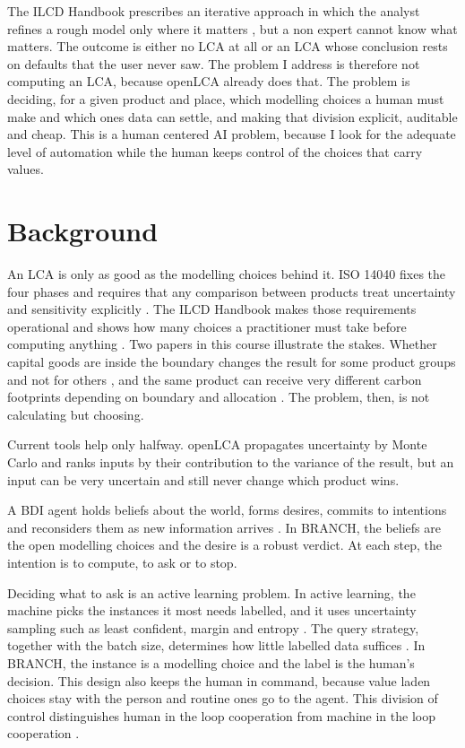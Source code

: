 \documentclass{article}
\begin{document}
The ILCD Handbook prescribes an iterative approach in which the analyst refines a rough model only where
it matters \citep[25]{ilcd2010}, but a non expert cannot know what matters. The outcome is either no LCA
at all or an LCA whose conclusion rests on defaults that the user never saw. The problem I address is therefore not computing an LCA, because openLCA already does that. The problem is
deciding, for a given product and place, which modelling choices a human must make and which ones data can
settle, and making that division explicit, auditable and cheap. This is a human centered AI problem,
because I look for the adequate level of automation while the human keeps control of the choices that
carry values.

\section{Background}
An LCA is only as good as the modelling choices behind it. ISO 14040 fixes the four phases and requires
that any comparison between products treat uncertainty and sensitivity explicitly \citep{iso14040}. The
ILCD Handbook makes those requirements operational and shows how many choices a practitioner must take
before computing anything \citep{ilcd2010}. Two papers in this course illustrate the stakes. Whether capital goods are inside the
boundary changes the result for some product groups and not for others \citep{frischknecht2007}, and the
same product can receive very different carbon footprints depending on boundary and allocation
\citep{schmidt2009}. The problem, then, is not calculating but choosing.

Current tools help only halfway. openLCA propagates uncertainty by Monte Carlo and ranks inputs by their
contribution to the variance of the result, but an input can be very uncertain and still never change
which product wins.

A BDI agent holds beliefs about the world, forms
desires, commits to intentions and reconsiders them as new information arrives
\citep{wooldridge2009,russell2020}. In BRANCH, the beliefs are the open modelling choices and the desire
is a robust verdict. At each step, the intention is to compute, to ask or to stop.

Deciding what to ask is an active learning problem. In active learning, the machine picks the instances
it most needs labelled, and it uses uncertainty sampling such as least confident, margin and entropy
\citep{settles2009}. The query strategy, together with the batch size, determines how little labelled
data suffices \citep{faria2022}. In BRANCH, the instance is a modelling choice and the label is the
human's decision. This design also keeps the human in command, because value laden choices stay with the
person and routine ones go to the agent. This division of control distinguishes human in the loop cooperation
from machine in the loop cooperation \citep{shneiderman2022,dafoe2020}.
\end{document}
